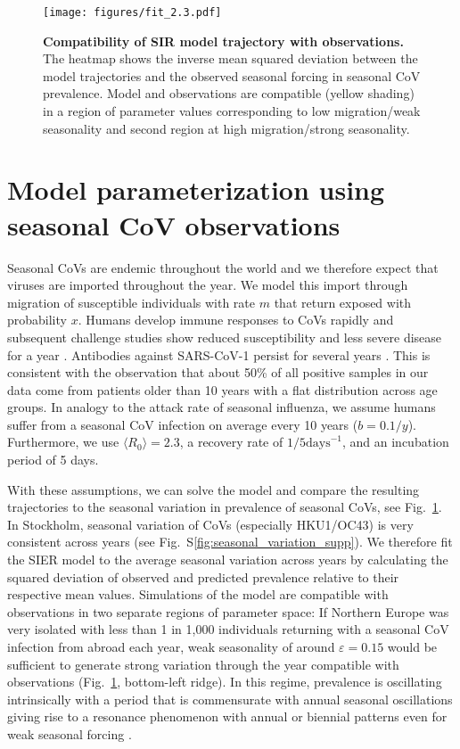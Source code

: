 \documentclass[rmp, reprint, superscriptaddress, floatfix,amsmath]{revtex4-1}
\newcommand{\forcing}{\varepsilon}
\begin{document}
\begin{figure}
    \centering
    \texttt{[image: figures/fit\_2.3.pdf]}
    \caption{{\bf Compatibility of SIR model trajectory with observations.} The heatmap shows the inverse mean squared deviation between the model trajectories and the observed seasonal forcing in seasonal CoV prevalence. Model and observations are compatible (yellow shading) in a region of parameter values corresponding to low migration/weak seasonality and second region at high migration/strong seasonality.}
    \label{fig:parameter_seasonal}
\end{figure}

\section{Model parameterization using seasonal CoV observations}
Seasonal CoVs are endemic throughout the world and we therefore expect that viruses are imported throughout the year. 
We model this import through migration of susceptible individuals with rate $m$ that return exposed with probability $x$. 
Humans develop immune responses to CoVs rapidly and subsequent challenge studies show reduced susceptibility and less severe disease for a year \citep{callow_time_1990}.
Antibodies against SARS-CoV-1 persist for several years \citep{guo_long-term_2020}. 
This is consistent with the observation that about 50\% of all positive samples in our data come from patients older than 10 years with a flat distribution across age groups.
In analogy to the attack rate of seasonal influenza, we assume humans suffer from a seasonal CoV infection on average every 10 years ($b=0.1/y$).
Furthermore, we use $\langle R_0\rangle=2.3$, a recovery rate of $1/5 \mathrm{days}^{-1}$, and an incubation period of 5 days.

With these assumptions, we can solve the model and compare the resulting trajectories to the seasonal variation in prevalence of seasonal CoVs, see Fig.~\ref{fig:parameter_seasonal}.
In Stockholm, seasonal variation of CoVs (especially HKU1/OC43) is very consistent across years (see Fig.~S\ref{fig:seasonal_variation_supp}). 
We therefore fit the SIER model to the average seasonal variation across years by calculating the squared deviation of observed and predicted prevalence relative to their respective mean values. 
Simulations of the model are compatible with observations in two separate regions of parameter space: If Northern Europe was very isolated with less than 1 in 1,000 individuals returning with a seasonal CoV infection from abroad each year, weak seasonality of around $\forcing=0.15$ would be sufficient to generate strong variation through the year compatible with observations (Fig.~\ref{fig:parameter_seasonal}, bottom-left ridge).
In this regime, prevalence is oscillating intrinsically with a period that is commensurate with annual seasonal oscillations giving rise to a resonance phenomenon with annual or biennial patterns even for weak seasonal forcing \citep{dushoff_dynamical_2004,chen_regular_2017}.
\end{document}
